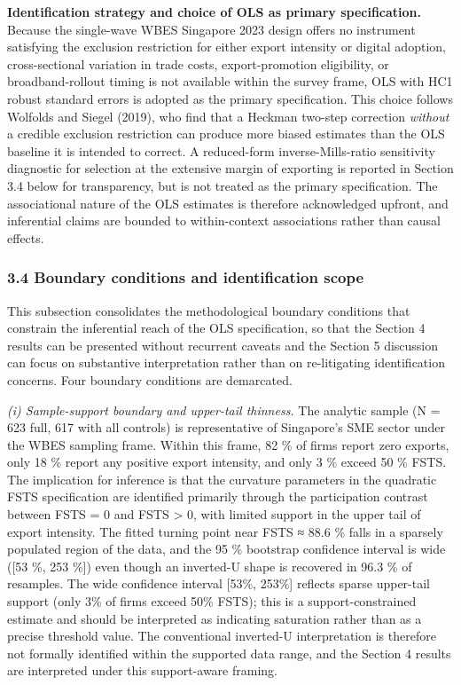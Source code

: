 \documentclass[
  12pt,a4paper]{article}
\begin{document}
\textbf{Identification strategy and choice of OLS as primary
specification.} Because the single-wave WBES Singapore 2023 design
offers no instrument satisfying the exclusion restriction for either
export intensity or digital adoption, cross-sectional variation in trade
costs, export-promotion eligibility, or broadband-rollout timing is not
available within the survey frame, OLS with HC1 robust standard errors
is adopted as the primary specification. This choice follows Wolfolds
and Siegel (2019), who find that a Heckman two-step correction
\emph{without} a credible exclusion restriction can produce more biased
estimates than the OLS baseline it is intended to correct. A
reduced-form inverse-Mills-ratio sensitivity diagnostic for selection at
the extensive margin of exporting is reported in Section 3.4 below for
transparency, but is not treated as the primary specification. The
associational nature of the OLS estimates is therefore acknowledged
upfront, and inferential claims are bounded to within-context
associations rather than causal effects.

\hypertarget{boundary-conditions-and-identification-scope}{%
\subsubsection{3.4 Boundary conditions and identification
scope}\label{boundary-conditions-and-identification-scope}}

This subsection consolidates the methodological boundary conditions that
constrain the inferential reach of the OLS specification, so that the
Section 4 results can be presented without recurrent caveats and the
Section 5 discussion can focus on substantive interpretation rather than
on re-litigating identification concerns. Four boundary conditions are
demarcated.

\emph{(i) Sample-support boundary and upper-tail thinness.} The analytic
sample (N = 623 full, 617 with all controls) is representative of
Singapore's SME sector under the WBES sampling frame. Within this frame,
82 \% of firms report zero exports, only 18 \% report any positive
export intensity, and only 3 \% exceed 50 \% FSTS. The implication for
inference is that the curvature parameters in the quadratic FSTS
specification are identified primarily through the participation
contrast between FSTS = 0 and FSTS \textgreater{} 0, with limited
support in the upper tail of export intensity. The fitted turning point
near FSTS ≈ 88.6 \% falls in a sparsely populated region of the data,
and the 95 \% bootstrap confidence interval is wide ({[}53 \%, 253
\%{]}) even though an inverted-U shape is recovered in 96.3 \% of
resamples. The wide confidence interval {[}53\%, 253\%{]} reflects
sparse upper-tail support (only 3\% of firms exceed 50\% FSTS); this is
a support-constrained estimate and should be interpreted as indicating
saturation rather than as a precise threshold value. The conventional
inverted-U interpretation is therefore not formally identified within
the supported data range, and the Section 4 results are interpreted
under this support-aware framing.
\end{document}
